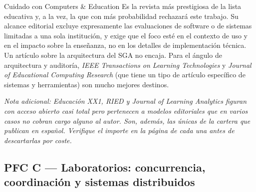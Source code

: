 \documentclass[11pt,a4paper]{article}
\newcommand{\jcrnote}[1]{{\footnotesize\itshape #1}}
\begin{document}
\begin{alerta}{Cuidado con Computers \& Education}
	Es la revista más prestigiosa de la lista educativa y, a la vez, la que con más probabilidad rechazará este trabajo. Su alcance editorial excluye expresamente las evaluaciones de software o de sistemas limitadas a una sola institución, y exige que el foco esté en el contexto de uso y en el impacto sobre la enseñanza, no en los detalles de implementación técnica. Un artículo sobre la arquitectura del SGA no encaja. Para el ángulo de arquitectura y auditoría, \emph{IEEE Transactions on Learning Technologies} y \emph{Journal of Educational Computing Research} (que tiene un tipo de artículo específico de sistemas y herramientas) son mucho mejores destinos.
\end{alerta}

\jcrnote{Nota adicional: \emph{Educación XX1}, \emph{RIED} y \emph{Journal of Learning Analytics} figuran con acceso abierto casi total pero pertenecen a modelos editoriales que en varios casos no cobran cargo alguno al autor. Son, además, las únicas de la cartera que publican en español. Verifique el importe en la página de cada una antes de descartarlas por coste.}

\subsection{PFC C --- Laboratorios: concurrencia, coordinación y sistemas distribuidos}
\end{document}

